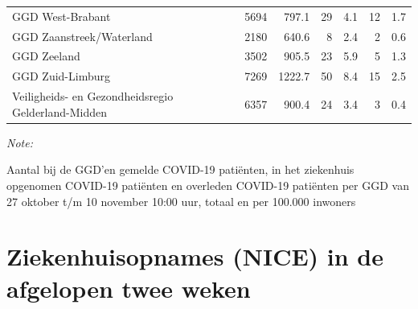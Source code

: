 \documentclass[
  english,
  man,floatsintext]{apa6}
\begin{document}
\begin{table}
\begin{threeparttable}
\begin{tabular}{lrrrrrr}
GGD West-Brabant & 5694 & 797.1 & 29 & 4.1 & 12 & 1.7\\
GGD Zaanstreek/Waterland & 2180 & 640.6 & 8 & 2.4 & 2 & 0.6\\
GGD Zeeland & 3502 & 905.5 & 23 & 5.9 & 5 & 1.3\\
GGD Zuid-Limburg & 7269 & 1222.7 & 50 & 8.4 & 15 & 2.5\\
Veiligheids- en Gezondheidsregio Gelderland-Midden & 6357 & 900.4 & 24 & 3.4 & 3 & 0.4\\
\bottomrule
\end{tabular}
\begin{tablenotes}
\item \textit{Note: } 
\item Aantal bij de GGD’en gemelde COVID-19 patiënten, in het ziekenhuis opgenomen COVID-19 patiënten en overleden COVID-19 patiënten per GGD van 27 oktober t/m 10 november 10:00 uur, totaal en per 100.000 inwoners
\end{tablenotes}
\end{threeparttable}
\endgroup{}
\end{table}

\newpage

\hypertarget{ziekenhuisopnames-nice-in-de-afgelopen-twee-weken}{%
\section{Ziekenhuisopnames (NICE) in de afgelopen twee weken}\label{ziekenhuisopnames-nice-in-de-afgelopen-twee-weken}}
\end{document}
